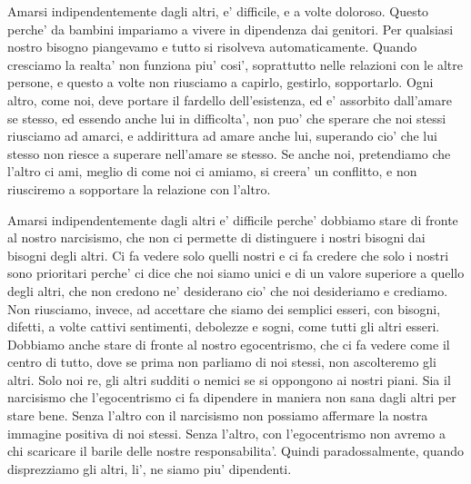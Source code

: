 Amarsi indipendentemente dagli altri, e' difficile, e a volte doloroso. Questo perche' da bambini impariamo a vivere in dipendenza dai genitori. Per qualsiasi nostro bisogno piangevamo e tutto si risolveva automaticamente. Quando cresciamo la realta' non funziona piu' cosi', soprattutto nelle relazioni con le altre persone, e questo a volte non riusciamo a capirlo, gestirlo, sopportarlo. 
Ogni altro, come noi, deve portare il fardello dell'esistenza, ed e' assorbito dall'amare se stesso, ed essendo anche lui in difficolta', non puo' che sperare che noi stessi riusciamo ad amarci, e addirittura ad amare anche lui, superando cio' che lui stesso non riesce a superare nell'amare se stesso. Se anche noi, pretendiamo che l'altro ci ami, meglio di come noi ci amiamo, si creera' un conflitto, e non riusciremo a sopportare la relazione con l'altro.

Amarsi indipendentemente dagli altri e' difficile perche' dobbiamo stare di fronte al nostro narcisismo, che non ci permette di distinguere i nostri bisogni dai bisogni degli altri. 
Ci fa vedere solo quelli nostri e ci fa credere che solo i nostri sono prioritari perche' ci dice che noi siamo unici e di un valore superiore a quello degli altri, che non credono ne' desiderano cio' che noi desideriamo e crediamo. Non riusciamo, invece, ad accettare che siamo dei semplici esseri, con bisogni, difetti, a volte cattivi sentimenti, debolezze e sogni, come tutti gli altri esseri. 
Dobbiamo anche stare di fronte al nostro egocentrismo, che ci fa vedere come il centro di tutto, dove se prima non parliamo di noi stessi, non ascolteremo gli altri. Solo noi re, gli altri sudditi o nemici se si oppongono ai nostri piani. Sia il narcisismo che l'egocentrismo ci fa dipendere in maniera non sana dagli altri per stare bene. Senza l'altro con il narcisismo non possiamo affermare la nostra immagine positiva di noi stessi. Senza l'altro, con l'egocentrismo non avremo a chi scaricare il barile delle nostre responsabilita'. Quindi paradossalmente, quando disprezziamo gli altri, li', ne siamo piu' dipendenti.

